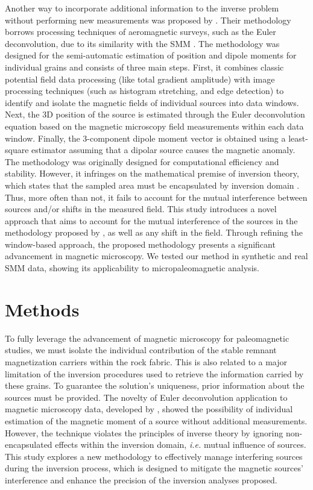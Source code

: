 Another way to incorporate additional information to the inverse problem without performing new measurements was proposed by \citet{Souza-Junior2024}. Their methodology borrows processing techniques of aeromagnetic surveys, such as the Euler deconvolution, due to its similarity with the SMM \citep{Weiss2007}. The methodology was designed for the semi-automatic estimation of position and dipole moments for individual grains and consists of three main steps. First, it combines classic potential field data processing (like total gradient amplitude) with image processing techniques (such as histogram stretching, and edge detection) to identify and isolate the magnetic fields of individual sources into data windows. Next, the 3D position of the source is estimated through the Euler deconvolution equation based on the magnetic microscopy field measurements within each data window. Finally, the 3-component dipole moment vector is obtained using a least-square estimator assuming that a dipolar source causes the magnetic anomaly. The methodology was originally designed for computational efficiency and stability. However, it infringes on the mathematical premise of inversion theory, which states that the sampled area must be encapsulated by inversion domain \citep{Baratchart2013, Lima2013}. Thus, more often than not, it fails to account for the mutual interference between sources and/or shifts in the measured field. This study introduces a novel approach that aims to account for the mutual interference of the sources in the methodology proposed by \citet{Souza-Junior2024}, as well as any shift in the field. Through refining the window-based approach, the proposed methodology presents a significant advancement in magnetic microscopy. We tested our method in synthetic and real SMM data, showing its applicability to micropaleomagnetic analysis.


\section{Methods}

To fully leverage the advancement of magnetic microscopy for paleomagnetic studies, we must isolate the individual contribution of the stable remnant magnetization carriers within the rock fabric. This is also related to a major limitation of the inversion procedures used to retrieve the information carried by these grains. To guarantee the solution's uniqueness, prior information about the sources must be provided. The novelty of Euler deconvolution application to magnetic microscopy data, developed by \citet{Souza-Junior2024}, showed the possibility of individual estimation of the magnetic moment of a source without additional measurements. However, the technique violates the principles of inverse theory by ignoring non-encapsulated effects within the inversion domain, \textit{i.e.} mutual influence of sources. This study explores a new methodology to effectively manage interfering sources during the inversion process, which is designed to mitigate the magnetic sources' interference and enhance the precision of the inversion analyses proposed.


